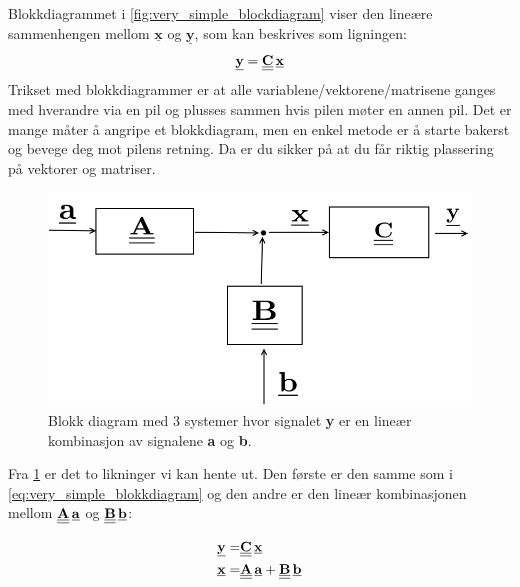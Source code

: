 Blokkdiagrammet i \cref{fig:very_simple_blockdiagram} viser den lineære sammenhengen mellom $\underline{\textbf{x}}$ og $\underline{\textbf{y}}$, som kan beskrives som ligningen: 
\begin{equation}
    \label{eq:very_simple_blokkdiagram}
    \underline{\textbf{y}} = \underline{\underline{\textbf{C}}}\,\underline{\textbf{x}}
\end{equation}
Trikset med blokkdiagrammer er at alle variablene/vektorene/matrisene ganges med hverandre via en pil og plusses sammen hvis pilen møter en annen pil. Det er mange måter å angripe et blokkdiagram, men en enkel metode er å starte bakerst og bevege deg mot pilens retning. Da er du sikker på at du får riktig plassering på vektorer og matriser.

\begin{figure}[H]
    \centering
    \includegraphics[scale=0.5]{Figures/simple_blockdiagram.png}
    \caption{Blokk diagram med 3 systemer hvor signalet \textbf{y} er en lineær kombinasjon av signalene \textbf{a} og \textbf{b}.}
    \label{fig:simple_blokkdiagram1}
\end{figure}

Fra \cref{fig:simple_blokkdiagram1} er det to likninger vi kan hente ut. Den første er den samme som i \cref{eq:very_simple_blokkdiagram} og den andre er den lineær kombinasjonen mellom $\underline{\underline{\textbf{A}}}\,\underline{\textbf{a}}$ og $\underline{\underline{\textbf{B}}}\,\underline{\textbf{b}}$:

\begin{align}
       \label{eq:simple_blokkdiagram}
    \underline{\textbf{y}} =& \underline{\underline{\textbf{C}}}\,\underline{\textbf{x}} \\
    \underline{\textbf{x}} =& \underline{\underline{\textbf{A}}}\,\underline{\textbf{a}} + \underline{\underline{\textbf{B}}}\,\underline{\textbf{b}}
\end{align}

